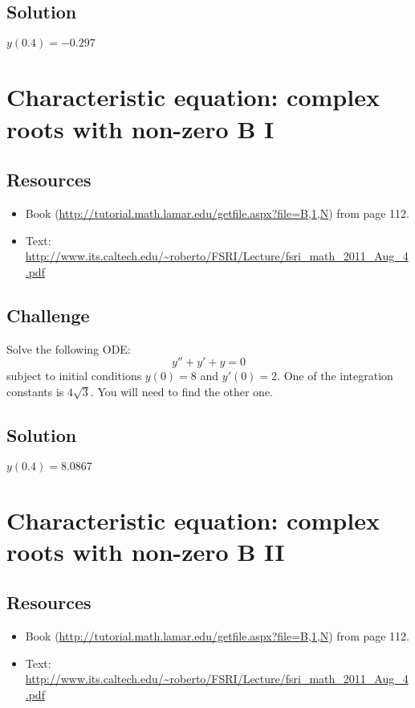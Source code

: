 \subsection*{Solution}
$y(0.4)=-0.297$




\newpage
\section{Characteristic equation: complex roots with non-zero B I}

\subsection*{Resources}
\begin{itemize}
    \item Book (\url{http://tutorial.math.lamar.edu/getfile.aspx?file=B,1,N}) from page 112.
    \item Text: \url{http://www.its.caltech.edu/~roberto/FSRI/Lecture/fsri_math_2011_Aug_4.pdf}
\end{itemize}

\subsection*{Challenge}
Solve the following ODE:
\begin{equation}
    y'' + y' + y = 0
\end{equation}
subject to initial conditions $y(0)=8$ and $y'(0)=2$. One of the integration constants is $4 \sqrt{3}$. You will need to find the other one.

\subsection*{Solution}
$y(0.4)=8.0867$




\newpage
\section{Characteristic equation: complex roots with non-zero B II}

\subsection*{Resources}
\begin{itemize}
    \item Book (\url{http://tutorial.math.lamar.edu/getfile.aspx?file=B,1,N}) from page 112.
    \item Text: \url{http://www.its.caltech.edu/~roberto/FSRI/Lecture/fsri_math_2011_Aug_4.pdf}
\end{itemize}

